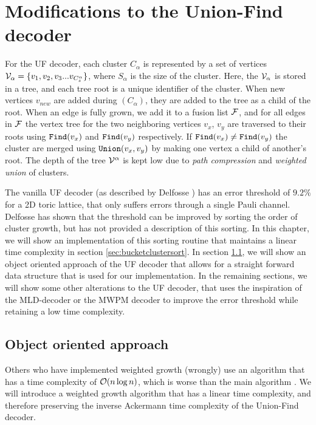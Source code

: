 \chapter{Modifications to the Union-Find decoder}
For the UF decoder, each cluster $C_\alpha$ is represented by a set of vertices $\mathcal{V}_\alpha = \{v_1, v_2, v_3 ... v_{C^\alpha_s}\}$, where $S_\alpha$ is the size of the cluster. Here, the $\mathcal{V}_\alpha$ is stored in a tree, and each tree root is a unique identifier of the cluster. When new vertices $v_{new}$ are added during $(C_\alpha)$, they are added to the tree as a child of the root. When an edge is fully grown, we add it to a fusion list $\mathcal{F}$, and for all edges in $\mathcal{F}$ the vertex tree for the two neighboring vertices $v_x$, $v_y$ are traversed to their roots using $\texttt{Find}(v_x)$ and $\texttt{Find}(v_y)$ respectively. If $\texttt{Find}(v_x) \neq \texttt{Find}(v_y)$ the cluster are merged using $\texttt{Union}(v_x, v_y)$ by making one vertex a child of another's root. The depth of the tree $\mathcal{V}^\alpha$ is kept low due to \emph{path compression} and \emph{weighted union} of clusters.

The vanilla UF decoder (as described by Delfosse \cite{delfosse2017almost}) has an error threshold of $9.2\%$ for a 2D toric lattice, that only suffers errors through a single Pauli channel. Delfosse has shown that the threshold can be improved by sorting the order of cluster growth, but has not provided a description of this sorting. In this chapter, we will show an implementation of this sorting routine that maintains a linear time complexity in section \ref{sec:bucketclustersort}. In section \ref{sec:oop}, we will show an object oriented approach of the UF decoder that allows for a straight forward data structure that is used for our implementation. In the remaining sections, we will show some other alterations to the UF decoder, that uses the inspiration of the MLD-decoder or the MWPM decoder to improve the error threshold while retaining a low time complexity.

\section{Object oriented approach}\label{sec:oop}

Others who have implemented weighted growth (wrongly) use an algorithm that has a time complexity of $\mathcal{O}(n\log n)$, which is worse than the main algorithm \cite{nando}. We will introduce a weighted growth algorithm that has a linear time complexity, and therefore preserving the inverse Ackermann time complexity of the Union-Find decoder.

